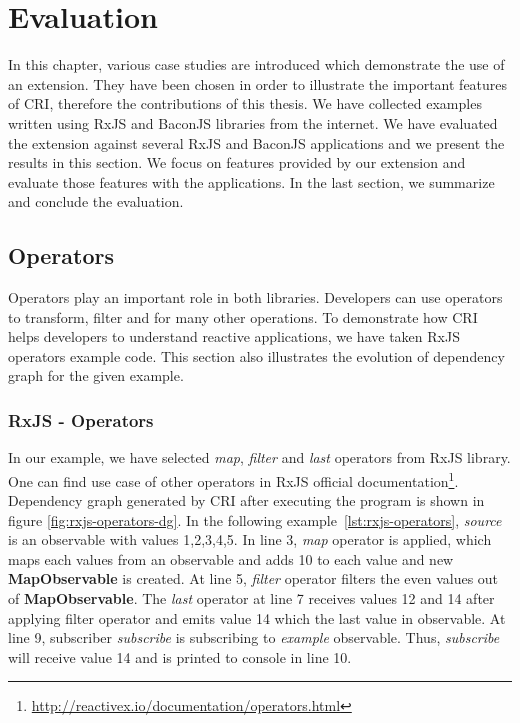 \chapter{Evaluation} \label{chap:Evaluation}
In this chapter, various case studies are introduced which demonstrate the use of an extension. They have been chosen in order to illustrate the important features of CRI, therefore the contributions of this thesis. We have collected examples written using RxJS and BaconJS libraries from the internet. We have evaluated the extension against several RxJS and BaconJS applications and we present the results in this section. We focus on features provided by our extension and evaluate those features with the applications. In the last section, we summarize and conclude the evaluation.

\section{Operators}
Operators play an important role in both libraries. Developers can use operators to transform, filter and for many other operations. To demonstrate how CRI helps developers to understand reactive applications, we have taken RxJS operators example code. This section also illustrates the evolution of dependency graph for the given example.

\subsection{RxJS - Operators}
In our example, we have selected \textit{map}, \textit{filter} and \textit{last} operators from RxJS library. One can find use case of other operators in RxJS official documentation\footnote{\url{http://reactivex.io/documentation/operators.html}}. Dependency graph generated by CRI after executing the program is shown in figure \ref{fig:rxjs-operators-dg}. In the following example~\ref{lst:rxjs-operators}, \textit{source} is an observable with values {1,2,3,4,5}. In line 3, \textit{map} operator is applied, which maps each values from an observable and adds 10 to each value and new \textbf{MapObservable} is created. At line 5, \textit{filter} operator filters the even values out of \textbf{MapObservable}. The \textit{last} operator at line 7 receives values 12 and 14 after applying filter operator and emits value 14 which the last value in observable. At line 9, subscriber \textit{subscribe} is subscribing to \textit{example} observable. Thus, \textit{subscribe} will receive value 14 and is printed to console in line 10.


